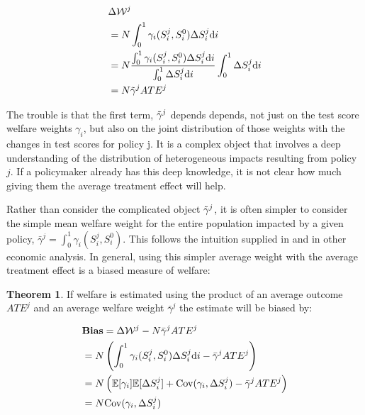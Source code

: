 \documentclass[12pt]{article}
\theoremstyle{definition}
\theoremstyle{definition}
\theoremstyle{definition}
\theoremstyle{definition}
\newtheorem{thm}{Theorem}
\begin{document}
    \begin{align}
           & \Delta \mathcal{W}^j \\
           &  = N \int_0^1 \gamma_i(S_i^j, S_i^0) \Delta S^j_i \text{d}i\\
           & = N \frac{\int_0^1 \gamma_i(S_i^j, S_i^0) \Delta S^j_i \text{d}i}{\int_0^1 \Delta S^j_i \text{d}i} \int_0^1 \Delta S^j_i \text{d}i \\
           & =  N \Tilde{\gamma}^j ATE^j 
    \end{align}

    The trouble is that the first term, $\Tilde{\gamma}^j$ depends depends, not just on the test score welfare weights $\gamma_i$, but also on the joint distribution of those weights with the changes in test scores for policy j. It is a complex object that involves a deep understanding of the distribution of heterogeneous impacts resulting from policy $j$. If a policymaker already has this deep knowledge, it is not clear how much giving them the average treatment effect will help.

    Rather than consider the complicated object $\Tilde{\gamma}^j$, it is often simpler to consider the simple mean welfare weight for the entire population impacted by a given policy, $\bar{\gamma}^j = \int_0^1 \gamma_i(S_i^j, S_i^0)$. This follows the intuition supplied in \cite{Keyser_2020} and in other economic analysis. In general, using this simpler average weight with the average treatment effect is a biased measure of welfare:
    
  \begin{thm}
    If welfare is estimated using the product of an average outcome $ATE^j$ and an average welfare weight $\bar{\gamma}^j$ the estimate will be biased by: 
    
    \begin{align}
       & \textbf{Bias} = \Delta \mathcal{W}^j - N\bar{\gamma}^j ATE^j \\
       & =  N \left( \int_0^1 \gamma_i(S_i^j, S_i^0) \Delta S^j_i \text{d}i - \bar{\gamma}^j ATE^j \right) \\
       & = N \left( \mathbb{E}[\gamma_i] \mathbb{E}[\Delta S^j_i] + \mathrm{Cov}(\gamma_i, \Delta S^j_i) - \bar{\gamma}^j ATE^j \right) \\
       & = N \mathrm{Cov}(\gamma_i, \Delta S^j_i)
    \end{align}
    \end{thm}
\end{document}
